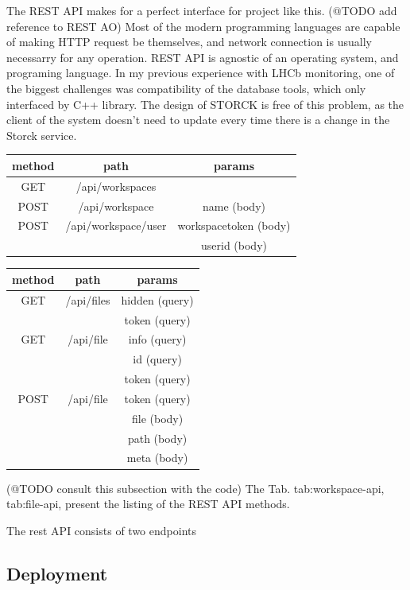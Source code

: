 The REST API makes for a perfect interface for project like this.
(@TODO add reference to REST A{O})
Most of the modern programming languages are capable of making HTTP request be themselves, and network connection is usually necessarry for any operation.
REST API is agnostic of an operating system, and programing language.
In my previous experience with LHCb monitoring, one of the biggest challenges was compatibility of the database tools, which only interfaced by C++ library.
The design of STORCK is free of this problem, as the client of the system doesn't need to update every time there is a change in the Storck service.


\begin{center}
\begin{tabular}{ c c c }
\hline
method & path & params \\
\hline
GET & /api/workspaces &  \\
\hline
POST & /api/workspace & name (body) \\
\hline
POST & /api/workspace/user & workspacetoken (body) \\
 & & userid (body)
 \label{tab:workspace-api}
\end{tabular}
\end{center}


\begin{center}
\begin{tabular}{ c c c }
\hline
method & path & params \\
\hline
GET & /api/files & hidden (query) \\
 & & token (query) \\
\hline
 GET & /api/file & info (query) \\
 & & id (query) \\
 & & token (query) \\
\hline
 POST & /api/file & token (query) \\
 & & file (body) \\
 & & path (body) \\
 & & meta (body)
  \label{tab:file-api}
\end{tabular}
\end{center}

(@TODO consult this subsection with the code)
The Tab. {tab:workspace-api}, {tab:file-api}, present the listing of the REST API methods.

The rest API consists of two endpoints

\subsection{Deployment}

